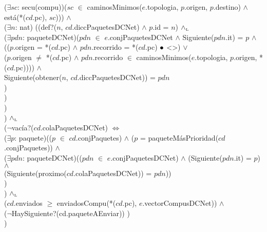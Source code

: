 {	\- \- \- \- ($\exists sc$: secu(compu))($sc$ $\in$
		caminosMinimos($e$.topologia, $p$.origen, $p$.destino) $\land$
		está(*($cd$.pc), $sc$))) $\land$ \\
	\- \- \- \- ($\exists n$: nat)
		((def?($n$, $cd$.diccPaquetesDCNet) $\land$ $p$.id = $n$) $\land_{\mathrm{\scriptscriptstyle{L}}}$ \\
	\- \- \- \- \- ($\exists pdn$: paqueteDCNet)($pdn$ $\in$ $e$.conjPaquetesDCNet $\land$ Siguiente($pdn$.it) = $p$ $\land$ \\
	\- \- \- \- \- \- (($p$.origen = *($cd$.pc) $\land$ $pdn$.recorrido = *($cd$.pc) $\bullet$ <>) $\lor$ \\
	\- \- \- \- \- \- ($p$.origen $\neq$ *($cd$.pc) $\land$
		$pdn$.recorrido $\in$ caminosMinimos($e$.topologia, $p$.origen,
		*($cd$.pc)))) $\land$ \\
	\- \- \- \- \- \- Siguiente(obtener($n$, $cd$.diccPaquetesDCNet)) = $pdn$ \\
	\- \- \- \- \- ) \\
	\- \- \- \- ) \\
	\- \- \- ) \\
	\- \- ) $\land_{\mathrm{\scriptscriptstyle{L}}}$ \\
	\- \- ($\neg$vacía?($cd$.colaPaquetesDCNet) $\Leftrightarrow$ \\
	\- \- \- ($\exists p$: paquete)(($p$ $\in$ $cd$.conjPaquetes) $\land$
		($p$ = paqueteMásPrioridad($cd$.conjPaquetes)) $\land$ \\
	\- \- \- \- ($\exists pdn$: paqueteDCNet)(($pdn$ $\in$
		$e$.conjPaquetesDCNet) $\land$ (Siguiente($pdn$.it) = $p$) $\land$ \\
	\- \- \- \-	(Siguiente(proximo($cd$.colaPaquetesDCNet)) = $pdn$)) \\
	\- \- \- ) \\
	\- \- ) $\land_{\mathrm{\scriptscriptstyle{L}}}$ \\
	\- \- ($cd$.enviados $\geq$ enviadosCompu(*($cd$.pc), $e$.vectorCompusDCNet)) $\land$\\
	\- \- ($\neg$HaySiguiente?(cd.paqueteAEnviar))
	\- ) \\
	)
}\mbox{}


